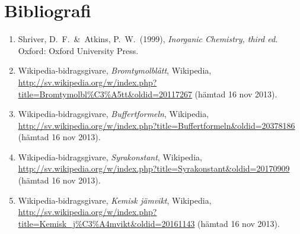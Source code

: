 \documentclass[a4paper,12pt]{article}
\begin{document}
\section{Bibliografi}
\begin{enumerate}
\item Shriver, D.~F.~\&~Atkins, P.~W.~(1999), \textit{Inorganic Chemistry, third ed}. Oxford: Oxford University Press.
\item Wikipedia-bidragsgivare, \textit{Bromtymolblått}, Wikipedia, \url{http://sv.wikipedia.org/w/index.php?title=Bromtymolbl%C3%A5tt&oldid=20117267} (hämtad 16 nov 2013).
\item Wikipedia-bidragsgivare, \textit{Buffertformeln}, Wikipedia, \url{http://sv.wikipedia.org/w/index.php?title=Buffertformeln&oldid=20378186} (hämtad 16 nov 2013).
\item Wikipedia-bidragsgivare, \textit{Syrakonstant}, Wikipedia, \url{http://sv.wikipedia.org/w/index.php?title=Syrakonstant&oldid=20170909} (hämtad 16 nov 2013).
\item Wikipedia-bidragsgivare, \textit{Kemisk jämvikt}, Wikipedia, \url{http://sv.wikipedia.org/w/index.php?title=Kemisk_j%C3%A4mvikt&oldid=20161143} (hämtad 16 nov 2013). 
\end{enumerate}
\end{document}
